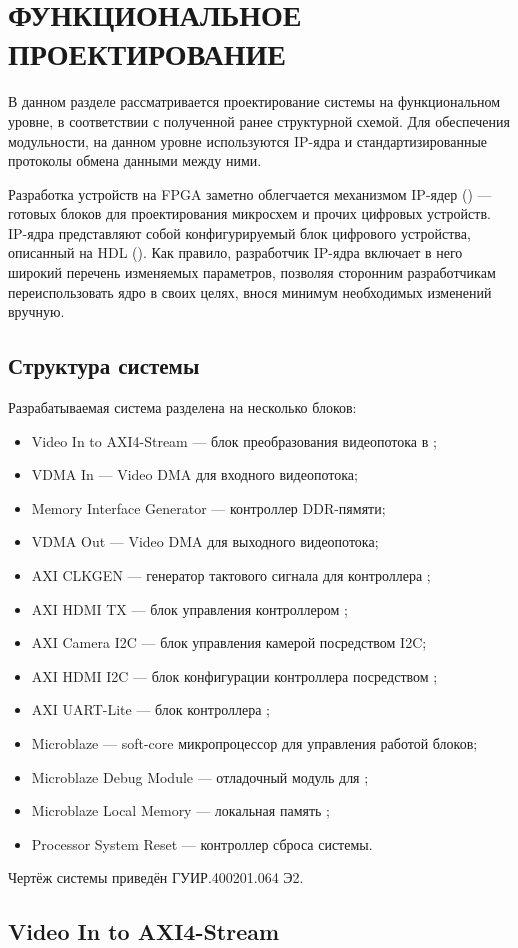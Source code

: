\section{ФУНКЦИОНАЛЬНОЕ ПРОЕКТИРОВАНИЕ}
\label{sec:functional}

В данном разделе рассматривается проектирование системы на функциональном уровне, в
соответствии с полученной ранее структурной схемой. Для обеспечения модульности,
на данном уровне используются IP-ядра и стандартизированные протоколы обмена данными
между ними.

Разработка устройств на FPGA заметно облегчается механизмом IP-ядер () --- готовых
блоков для проектирования микросхем и прочих цифровых устройств. IP-ядра представляют собой
конфигурируемый блок цифрового устройства, описанный на HDL ().
Как правило, разработчик IP-ядра включает в него широкий перечень изменяемых параметров,
позволяя сторонним разработчикам переиспользовать ядро в своих целях, внося минимум необходимых
изменений вручную.

\subsection{Структура системы}
\label{sec:functional:structure}

Разрабатываемая система разделена на несколько блоков:

\begin{itemize}
  \item Video In to AXI4-Stream --- блок преобразования видеопотока в ;
  \item VDMA In --- Video DMA для входного видеопотока;
  \item Memory Interface Generator --- контроллер DDR-пямяти;
  \item VDMA Out --- Video DMA для выходного видеопотока;
  \item AXI CLKGEN --- генератор тактового сигнала для контроллера ;
  \item AXI HDMI TX --- блок управления контроллером ;
  \item AXI Camera I2C --- блок управления камерой посредством I2C;
  \item AXI HDMI I2C --- блок конфигурации контроллера  посредством ;
  \item AXI UART-Lite --- блок контроллера ;
  \item Microblaze --- soft-core микропроцессор для управления работой блоков;
  \item Microblaze Debug Module --- отладочный модуль для ;
  \item Microblaze Local Memory --- локальная память ;
  \item Processor System Reset --- контроллер сброса системы.
\end{itemize}

Чертёж системы приведён ГУИР.400201.064 Э2.

\subsection{Video In to AXI4-Stream}
\label{sec:functional:video_in_to_axi4stream}

